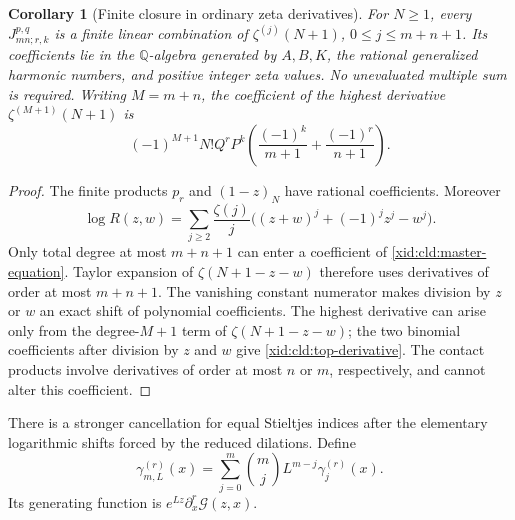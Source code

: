 \documentclass[11pt,a4paper]{article}
\numberwithin{equation}{section}
\newtheorem{corollary}[theorem]{Corollary}
\theoremstyle{definition}
\theoremstyle{remark}
\begin{document}
\begin{corollary}[Finite closure in ordinary zeta derivatives]
For $N\ge1$, every $J_{mn;r,k}^{p,q}$ is a finite linear combination of
$\zeta^{(j)}(N+1)$, $0\le j\le m+n+1$.  Its coefficients lie in the
$\mathbb Q$-algebra generated by $A,B,K$, the rational generalized
harmonic numbers, and positive integer zeta values.  No unevaluated
multiple sum is required.  Writing $M=m+n$, the coefficient of the
highest derivative $\zeta^{(M+1)}(N+1)$ is
\begin{equation}
 (-1)^{M+1}N!Q^rP^k
       \left(\frac{(-1)^k}{m+1}+\frac{(-1)^r}{n+1}\right).
 \label{xid:cld:top-derivative}
\end{equation}
\end{corollary}
\begin{proof}
The finite products $p_r$ and $(1-z)_N$ have rational coefficients.
Moreover
\begin{equation}
 \log R(z,w)=\sum_{j\ge2}\frac{\zeta(j)}j
       \bigl((z+w)^j+(-1)^jz^j-w^j\bigr).
 \label{xid:cld:logR}
\end{equation}
Only total degree at most $m+n+1$ can enter a coefficient of
\eqref{xid:cld:master-equation}.  Taylor expansion of $\zeta(N+1-z-w)$
therefore uses derivatives of order at most $m+n+1$.  The vanishing
constant numerator makes division by $z$ or $w$ an exact shift of
polynomial coefficients.  The highest derivative can arise only from
the degree-$M+1$ term of $\zeta(N+1-z-w)$; the two binomial
coefficients after division by $z$ and $w$ give
\eqref{xid:cld:top-derivative}.  The contact products involve derivatives of
order at most $n$ or $m$, respectively, and cannot alter this coefficient.
\end{proof}

There is a stronger cancellation for equal Stieltjes indices after the
elementary logarithmic shifts forced by the reduced dilations.  Define
\[
 \gamma_{m,L}^{(r)}(x)=\sum_{j=0}^m\binom mj L^{m-j}
                                      \gamma_j^{(r)}(x).
\]
Its generating function is $e^{Lz}\partial_x^r\mathscr G(z,x)$.
\end{document}
